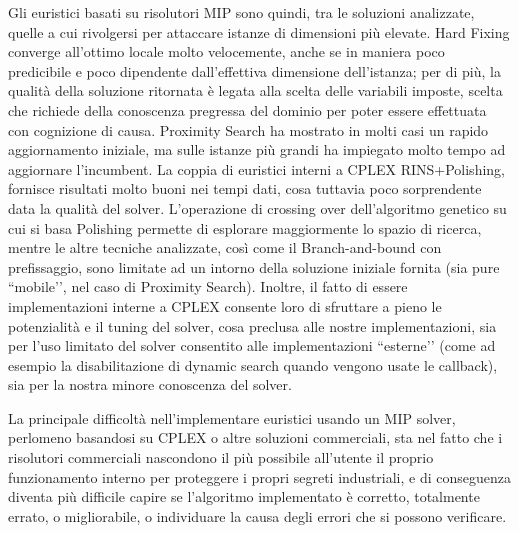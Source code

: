 Gli euristici basati su risolutori MIP sono quindi, tra le soluzioni analizzate, quelle a cui rivolgersi per attaccare istanze di dimensioni più elevate. Hard Fixing converge all’ottimo locale molto velocemente, anche se in maniera poco predicibile e poco dipendente dall’effettiva dimensione dell’istanza; per di più, la qualità della soluzione ritornata è legata alla scelta delle variabili imposte, scelta che richiede della conoscenza pregressa del dominio per poter essere effettuata con cognizione di causa. Proximity Search ha mostrato in molti casi un rapido aggiornamento iniziale, ma sulle istanze più grandi ha impiegato molto tempo ad aggiornare l'incumbent. La coppia di euristici interni a CPLEX RINS+Polishing, fornisce risultati molto buoni nei tempi dati, cosa tuttavia poco sorprendente data la qualità del solver. L’operazione di crossing over dell’algoritmo genetico su cui si basa Polishing permette di esplorare maggiormente lo spazio di ricerca, mentre le altre tecniche analizzate, così come il Branch-and-bound con prefissaggio, sono limitate ad un intorno della soluzione iniziale fornita (sia pure ``mobile’’, nel caso di Proximity Search). Inoltre, il fatto di essere implementazioni interne a CPLEX consente loro di sfruttare a pieno le potenzialità e il tuning del solver, cosa preclusa alle nostre implementazioni, sia per l’uso limitato del solver consentito alle implementazioni ``esterne’’ (come ad esempio la disabilitazione di dynamic search quando vengono usate le callback), sia per la nostra minore conoscenza del solver.

La principale difficoltà nell’implementare euristici usando un MIP solver, perlomeno basandosi su CPLEX o altre soluzioni commerciali, sta nel fatto che i risolutori commerciali nascondono il più possibile all’utente il proprio funzionamento interno per proteggere i propri segreti industriali, e di conseguenza diventa più difficile capire se l’algoritmo implementato è corretto, totalmente errato, o migliorabile, o individuare la causa degli errori che si possono verificare.
